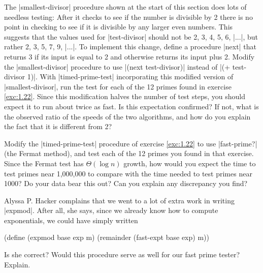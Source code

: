 \begin{Exercise}
\label{exc:1.23}
The \scheme|smallest-divisor| procedure shown at the start of this section
does lots of needless testing: After it checks to see if the
number is divisible by 2 there is no point in checking to see if
it is divisible by any larger even numbers.  This suggests that the
values used for \scheme|test-divisor| should not be 2, 3, 4, 5, 6,
\scheme|...|, but rather 2, 3, 5, 7, 9, \scheme|...|.  To implement this
change, define a procedure \scheme|next| that returns 3 if its input is
equal to 2 and otherwise returns its input plus 2.  Modify the \scheme|smallest-divisor| procedure to use \scheme|(next test-divisor)| instead
of \scheme|(+ test-divisor 1)|.  With \scheme|timed-prime-test|
incorporating this modified version of \scheme|smallest-divisor|, run the
test for each of the 12 primes found in
exercise \ref{exc:1.22}.  Since this modification halves the
number of test steps, you should expect it to run about twice as fast.
Is this expectation confirmed?  If not, what is the observed ratio of
the speeds of the two algorithms, and how do you explain the fact that
it is different from 2?
\end{Exercise}

\begin{Exercise}
\label{exc:1.24}
Modify the \scheme|timed-prime-test| procedure of
exercise \ref{exc:1.22} to use \scheme|fast-prime?| (the
Fermat method), and test each of the 12 primes you found in that
exercise.  Since the Fermat test has $\Theta(\log n)$ growth, how
would you expect the time to test primes near 1,000,000 to compare
with the time needed to test primes near 1000?  Do your data bear this
out?  Can you explain any discrepancy you find?
\end{Exercise}


\begin{Exercise}
\label{exc:1.25}
 Alyssa P. Hacker complains that we went to a lot of extra work in
writing \scheme|expmod|.  After all, she says, since we already know how
to compute exponentials, we could have simply written

\begin{schemedisplay}
(define (expmod base exp m)
  (remainder (fast-expt base exp) m))
\end{schemedisplay}
Is she correct?  Would this procedure serve as well for our fast prime
tester?  Explain.
\end{Exercise}


